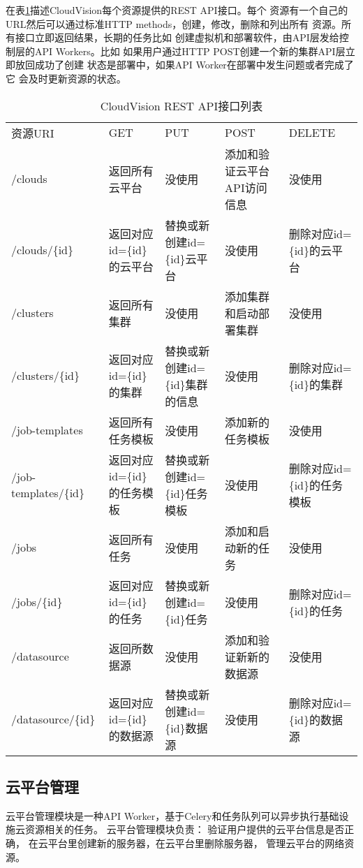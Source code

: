 在表\ref{tab:cloudvision-api}描述CloudVision每个资源提供的REST API接口。每个
资源有一个自己的URL然后可以通过标准HTTP methods，创建，修改，删除和列出所有
资源。\cite{wiki:rest}所有接口立即返回结果，长期的任务比如
创建虚拟机和部署软件，由API层发给控制层的API Workers。比如
如果用户通过HTTP POST创建一个新的集群API层立即放回成功了创建
状态是部署中，如果API Worker在部署中发生问题或者完成了它
会及时更新资源的状态。

\begin{table}[H]
  \centering
  \begin{minipage}[t]{0.98\linewidth} %
  \caption[CloudVision API接口列表]{CloudVision REST API接口列表}
  \label{tab:cloudvision-api}
    \begin{tabularx}{\linewidth}{lXXXX}
      \toprule[1.5pt]
        资源URI & GET & PUT & POST & DELETE \\
        /clouds & 返回所有云平台 & 没使用 & 添加和验证云平台API访问信息 & 没使用 \\
        /clouds/\{id\} & 返回对应id=\{id\}的云平台 & 替换或新创建id=\{id\}云平台 &  没使用 & 删除对应id=\{id\}的云平台 \\
        /clusters & 返回所有集群 & 没使用 & 添加集群和启动部署集群 & 没使用 \\
        /clusters/\{id\} & 返回对应id=\{id\}的集群 & 替换或新创建id=\{id\}集群的信息 &  没使用 & 删除对应id=\{id\}的集群 \\
        /job-templates & 返回所有任务模板 & 没使用 & 添加新的任务模板 & 没使用 \\
        /job-templates/\{id\} & 返回对应id=\{id\}的任务模板 & 替换或新创建id=\{id\}任务模板 &  没使用 & 删除对应id=\{id\}的任务模板 \\
        /jobs & 返回所有任务 & 没使用 & 添加和启动新的任务 & 没使用 \\
        /jobs/\{id\} & 返回对应id=\{id\}的任务 & 替换或新创建id=\{id\}任务 &  没使用 & 删除对应id=\{id\}的任务 \\
        /datasource & 返回所数据源 & 没使用 & 添加和验证新新的数据源 & 没使用 \\
        /datasource/\{id\} & 返回对应id=\{id\}的数据源 & 替换或新创建id=\{id\}数据源 &  没使用 & 删除对应id=\{id\}的数据源 \\
      \bottomrule[1.5pt]
    \end{tabularx}
  \end{minipage}
\end{table}


\subsection{云平台管理}
\label{subsec:api-worker-cloud}
云平台管理模块是一种API Worker，基于Celery和任务队列可以异步执行基础设施云资源相关的任务。
云平台管理模块负责： 验证用户提供的云平台信息是否正确，
在云平台里创建新的服务器，在云平台里删除服务器，
管理云平台的网络资源。

